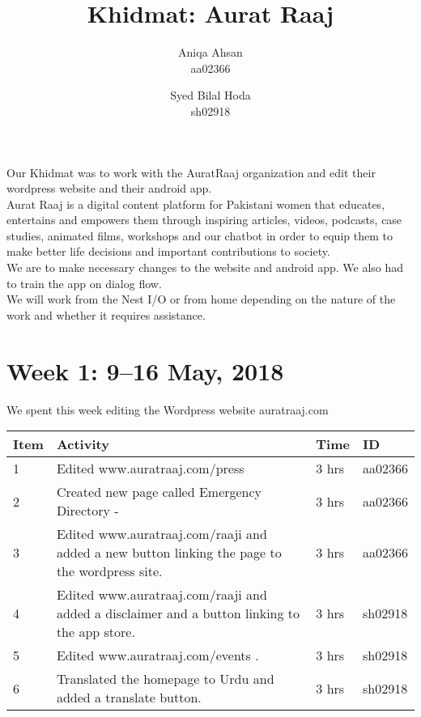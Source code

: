 \documentclass{article}
\title {Khidmat: Aurat Raaj}
\author{
  Aniqa Ahsan\\ aa02366
  \and
  Syed Bilal Hoda\\ sh02918
}
\date{}
\begin{document}
\maketitle


Our Khidmat was to work with the AuratRaaj organization and edit their wordpress website and their android app. \\

Aurat Raaj is a digital content platform for Pakistani women that educates, entertains and empowers them through inspiring articles, videos, podcasts, case studies, animated films, workshops and our chatbot in order to equip them to make better life decisions and important contributions to society. \\

We are to make necessary changes to the website and android app. We also had to train the app on dialog flow. \\

We will work from the Nest I/O or from home depending on the nature of the work and whether it requires assistance.  \\

\newpage %
\section*{Week 1: 9--16 May, 2018}

We spent this week editing the Wordpress website auratraaj.com

\begin{tabular}{|l|l|l|l|}
  \hline
  Item 	& Activity & Time & ID \\\hline\hline
  1	& Edited www.auratraaj.com/press  & 3 hrs & aa02366 \\\hline
  2	& Created new page called Emergency Directory - & 3 hrs & aa02366 \\\hline
  3	& Edited www.auratraaj.com/raaji and added a new button linking the page to the wordpress site. & 3 hrs & aa02366 \\\hline
  4	& Edited www.auratraaj.com/raaji and added a disclaimer and a button linking to the app store. & 3 hrs & sh02918 
  \\\hline
  5	& Edited www.auratraaj.com/events . & 3 hrs & sh02918 \\\hline
  6	& Translated the homepage to Urdu and added a translate button. & 3 hrs & sh02918 \\\hline
\end{tabular}
\end{document}
